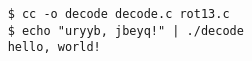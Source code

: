 \begin{verbatim}
    $ cc -o decode decode.c rot13.c
    $ echo "uryyb, jbeyq!" | ./decode
    hello, world!
    \end{verbatim}